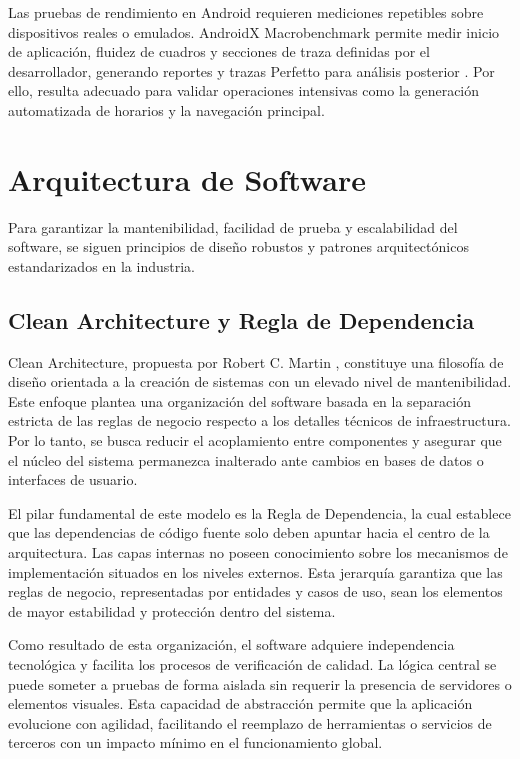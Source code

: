 Las pruebas de rendimiento en Android requieren mediciones repetibles sobre dispositivos reales o emulados. AndroidX Macrobenchmark permite medir inicio de aplicación, fluidez de cuadros y secciones de traza definidas por el desarrollador, generando reportes y trazas Perfetto para análisis posterior \cite{android_macrobenchmark}. Por ello, resulta adecuado para validar operaciones intensivas como la generación automatizada de horarios y la navegación principal.

\section{Arquitectura de Software}
\label{sec:arquitectura-software}

Para garantizar la mantenibilidad, facilidad de prueba y escalabilidad del software, se siguen principios de diseño robustos y patrones arquitectónicos estandarizados en la industria.

\subsection{Clean Architecture y Regla de Dependencia}
Clean Architecture, propuesta por Robert C. Martin \cite{martin2017-cleanarch}, constituye una filosofía de diseño orientada a la creación de sistemas con un elevado nivel de mantenibilidad. Este enfoque plantea una organización del software basada en la separación estricta de las reglas de negocio respecto a los detalles técnicos de infraestructura. Por lo tanto, se busca reducir el acoplamiento entre componentes y asegurar que el núcleo del sistema permanezca inalterado ante cambios en bases de datos o interfaces de usuario.

El pilar fundamental de este modelo es la Regla de Dependencia, la cual establece que las dependencias de código fuente solo deben apuntar hacia el centro de la arquitectura. Las capas internas no poseen conocimiento sobre los mecanismos de implementación situados en los niveles externos. Esta jerarquía garantiza que las reglas de negocio, representadas por entidades y casos de uso, sean los elementos de mayor estabilidad y protección dentro del sistema.

Como resultado de esta organización, el software adquiere independencia tecnológica y facilita los procesos de verificación de calidad. La lógica central se puede someter a pruebas de forma aislada sin requerir la presencia de servidores o elementos visuales. Esta capacidad de abstracción permite que la aplicación evolucione con agilidad, facilitando el reemplazo de herramientas o servicios de terceros con un impacto mínimo en el funcionamiento global.

